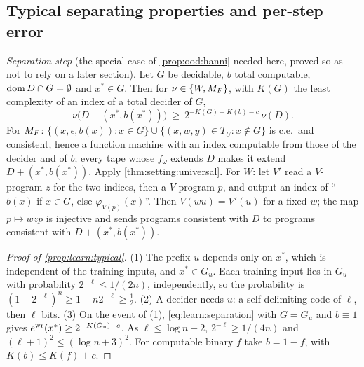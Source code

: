 \subsection{Typical separating properties and per-step error}\label{app:learn:typical}

\emph{Separation step} (the special case of \cref{prop:ood:hanni} needed here, proved so as not to rely on a later section). Let $G$ be decidable, $b$ total computable, $\operatorname{dom} D\cap G=\emptyset$ and $x^*\in G$. Then for $\nu\in\{W,M_{F}\}$, with $K(G)$ the least complexity of an index of a total decider of $G$,
\begin{equation}\label{eq:learn:separation}
\nu\big(D+(x^*,b(x^*))\big)\ \ge\ 2^{-K(G)-K(b)-c}\,\nu(D).
\end{equation}
For $M_{F}$: $\{(x,\epsilon,b(x)):x\in G\}\cup\{(x,w,y)\in T_U:x\notin G\}$ is c.e.\ and consistent, hence a function machine with an index computable from those of the decider and of $b$; every tape whose $f_\omega$ extends $D$ makes it extend $D+(x^*,b(x^*))$. Apply \cref{thm:setting:universal}. For $W$: let $V'$ read a $V$-program $z$ for the two indices, then a $V$-program $p$, and output an index of ``$b(x)$ if $x\in G$, else $\varphi_{V(p)}(x)$''. Then $V(wu)=V'(u)$ for a fixed $w$; the map $p\mapsto wzp$ is injective and sends programs consistent with $D$ to programs consistent with $D+(x^*,b(x^*))$.

\begin{proof}[Proof of \cref{prop:learn:typical}]
(1) The prefix $u$ depends only on $x^*$, which is independent of the training inputs, and $x^*\in G_u$. Each training input lies in $G_u$ with probability $2^{-\ell}\le1/(2n)$, independently, so the probability is $(1-2^{-\ell})^n\ge1-n2^{-\ell}\ge\frac12$. (2) A decider needs $u$: a self-delimiting code of $\ell$, then $\ell$ bits. (3) On the event of (1), \eqref{eq:learn:separation} with $G=G_u$ and $b\equiv1$ gives $e^{\rm wr}(x^*)\ge2^{-K(G_u)-c}$. As $\ell\le\log n+2$, $2^{-\ell}\ge1/(4n)$ and $(\ell+1)^2\le(\log n+3)^2$. For computable binary $f$ take $b=1-f$, with $K(b)\le K(f)+c$.
\end{proof}

